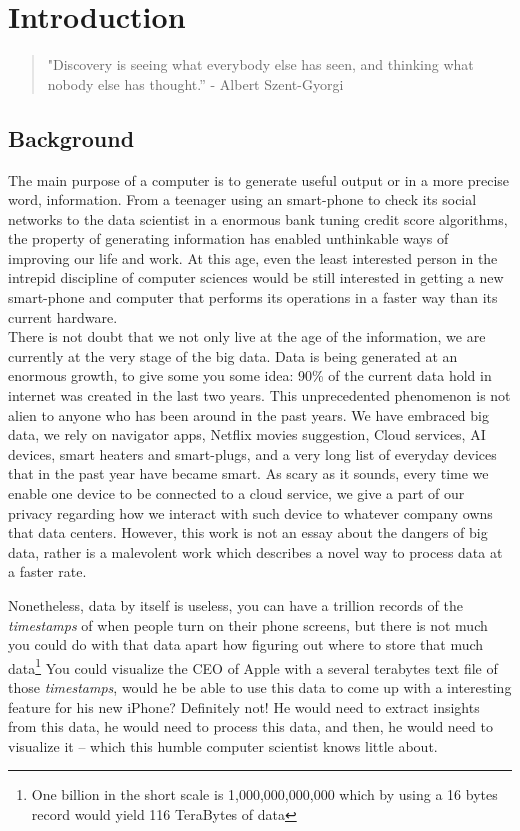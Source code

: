 \section{Introduction}

\begin{verse} "Discovery is seeing what everybody else has seen, and thinking
what nobody else has thought.” - Albert Szent-Gyorgi \end{verse}

\subsection{Background} 

The main purpose of a computer is to generate useful output or in a more
precise word, information. From a teenager using an smart-phone to check its
social networks to the data scientist in a enormous bank tuning credit score
algorithms, the property of generating information has enabled unthinkable ways
of improving our life and work. At this age, even the least interested person
in the intrepid discipline of computer sciences would be still interested in
getting a new smart-phone and computer that performs its operations in a faster
way than its current hardware.\\

There is not doubt that we not only live at the age of the information, we are
currently at the very stage of the big data. Data is being generated at an
enormous growth, to give some you some idea: 90\% of the current data hold in
internet was created in the last two years\cite{furht2016big}. This
unprecedented phenomenon is not alien to anyone who has been around in the past
years. We have embraced big data, we rely on navigator apps, Netflix movies
suggestion, Cloud services, AI devices, smart heaters and smart-plugs, 
and a very long list of everyday devices that in the past year have
became smart.  As scary as it sounds, every time we enable one device to be
connected to a cloud service, we give a part of our privacy regarding how we
interact with such device to whatever company owns that data centers. However,
this work is not an essay about the dangers of big data, rather is a malevolent
work which describes a novel way to process data at a faster rate.

Nonetheless, data by itself is useless, you can have a trillion records of the
\textit{timestamps} of when people turn on their phone screens, but there is
not much you could do with that data apart how figuring out where to store that
much data\footnote{One billion in the short scale is 1,000,000,000,000 which by
using a 16 bytes record would yield 116 TeraBytes of data} You could visualize
the CEO of Apple with a several terabytes text file of those
\textit{timestamps}, would he be able to use this data to come up with a
interesting feature for his new iPhone?  Definitely not! He would need to
extract insights from this data, he would need to process this data, and then,
he would need to visualize it -- which this humble computer scientist knows
little about. \\

